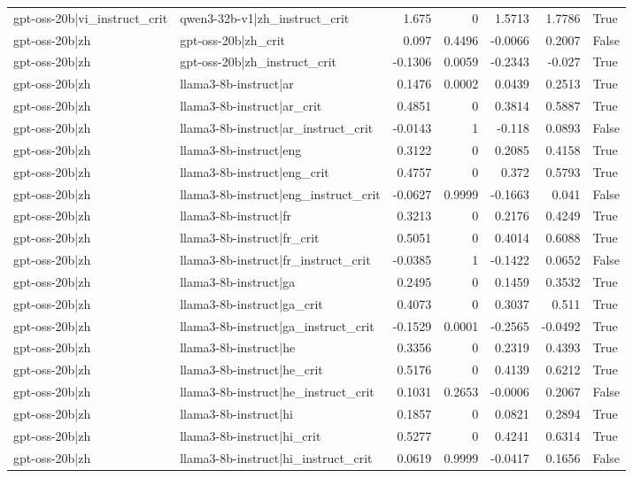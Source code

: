 \begin{table}
\begin{tabular}{l l r r r r l}
gpt-oss-20b|vi_instruct_crit & qwen3-32b-v1|zh_instruct_crit & 1.675 & 0 & 1.5713 & 1.7786 & True \\
gpt-oss-20b|zh & gpt-oss-20b|zh_crit & 0.097 & 0.4496 & -0.0066 & 0.2007 & False \\
gpt-oss-20b|zh & gpt-oss-20b|zh_instruct_crit & -0.1306 & 0.0059 & -0.2343 & -0.027 & True \\
gpt-oss-20b|zh & llama3-8b-instruct|ar & 0.1476 & 0.0002 & 0.0439 & 0.2513 & True \\
gpt-oss-20b|zh & llama3-8b-instruct|ar_crit & 0.4851 & 0 & 0.3814 & 0.5887 & True \\
gpt-oss-20b|zh & llama3-8b-instruct|ar_instruct_crit & -0.0143 & 1 & -0.118 & 0.0893 & False \\
gpt-oss-20b|zh & llama3-8b-instruct|eng & 0.3122 & 0 & 0.2085 & 0.4158 & True \\
gpt-oss-20b|zh & llama3-8b-instruct|eng_crit & 0.4757 & 0 & 0.372 & 0.5793 & True \\
gpt-oss-20b|zh & llama3-8b-instruct|eng_instruct_crit & -0.0627 & 0.9999 & -0.1663 & 0.041 & False \\
gpt-oss-20b|zh & llama3-8b-instruct|fr & 0.3213 & 0 & 0.2176 & 0.4249 & True \\
gpt-oss-20b|zh & llama3-8b-instruct|fr_crit & 0.5051 & 0 & 0.4014 & 0.6088 & True \\
gpt-oss-20b|zh & llama3-8b-instruct|fr_instruct_crit & -0.0385 & 1 & -0.1422 & 0.0652 & False \\
gpt-oss-20b|zh & llama3-8b-instruct|ga & 0.2495 & 0 & 0.1459 & 0.3532 & True \\
gpt-oss-20b|zh & llama3-8b-instruct|ga_crit & 0.4073 & 0 & 0.3037 & 0.511 & True \\
gpt-oss-20b|zh & llama3-8b-instruct|ga_instruct_crit & -0.1529 & 0.0001 & -0.2565 & -0.0492 & True \\
gpt-oss-20b|zh & llama3-8b-instruct|he & 0.3356 & 0 & 0.2319 & 0.4393 & True \\
gpt-oss-20b|zh & llama3-8b-instruct|he_crit & 0.5176 & 0 & 0.4139 & 0.6212 & True \\
gpt-oss-20b|zh & llama3-8b-instruct|he_instruct_crit & 0.1031 & 0.2653 & -0.0006 & 0.2067 & False \\
gpt-oss-20b|zh & llama3-8b-instruct|hi & 0.1857 & 0 & 0.0821 & 0.2894 & True \\
gpt-oss-20b|zh & llama3-8b-instruct|hi_crit & 0.5277 & 0 & 0.4241 & 0.6314 & True \\
gpt-oss-20b|zh & llama3-8b-instruct|hi_instruct_crit & 0.0619 & 0.9999 & -0.0417 & 0.1656 & False \\

\end{tabular}
\end{table}
